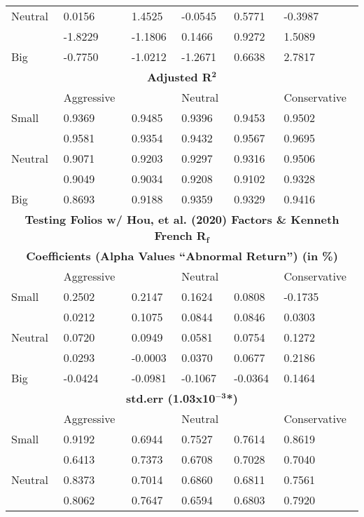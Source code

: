 \documentclass[11pt, english]{article}
\begin{document}
\begin{center}
\begin{longtable}{ p{1.5cm} | p{1.5cm} p{1.5cm} p{1.5cm} p{1.5cm} p{1.5cm} }
        Neutral & 0.0156 & 1.4525 & -0.0545 & 0.5771 & -0.3987\\
        & -1.8229 & -1.1806 & 0.1466 & 0.9272 & 1.5089\\
        Big & -0.7750 & -1.0212 & -1.2671 & 0.6638 & 2.7817\\
        \hline
        \multicolumn{6}{c}{\textbf{Adjusted R$\mathbf{^2}$}}\\
        \hline
        & Aggressive & & Neutral & & Conservative\\
        \hline
        Small & 0.9369 & 0.9485 & 0.9396 & 0.9453 & 0.9502\\
        & 0.9581 & 0.9354 & 0.9432 & 0.9567 & 0.9695\\
        Neutral & 0.9071 & 0.9203 & 0.9297 & 0.9316 & 0.9506\\
        & 0.9049 & 0.9034 & 0.9208 & 0.9102 & 0.9328\\
        Big & 0.8693 & 0.9188 & 0.9359 & 0.9329 & 0.9416\\
        \hline
        \hline
        \multicolumn{6}{c}{\textbf{Testing Folios w/ Hou, et al. (2020) Factors \& Kenneth French R$\mathbf{_f}$}}\\
        \hline
        \hline
        \multicolumn{6}{c}{\textbf{Coefficients (Alpha Values ``Abnormal Return'') (in \%)}}\\
	\hline
        & Aggressive & & Neutral & & Conservative\\
        \hline
        Small & 0.2502 & 0.2147 & 0.1624 & 0.0808 & -0.1735\\
        & 0.0212 & 0.1075 & 0.0844 & 0.0846 & 0.0303\\
        Neutral & 0.0720 & 0.0949 & 0.0581 & 0.0754 & 0.1272\\
        & 0.0293 & -0.0003 & 0.0370 & 0.0677 & 0.2186\\
        Big & -0.0424 & -0.0981 & -0.1067 & -0.0364 & 0.1464\\
        \hline
        \multicolumn{6}{c}{\textbf{std.err (1.03x10$\mathbf{^{-3}}$*)}}\\
        \hline
        & Aggressive & & Neutral & & Conservative\\
        \hline
        Small & 0.9192 & 0.6944 & 0.7527 & 0.7614 & 0.8619\\
        & 0.6413 & 0.7373 & 0.6708 & 0.7028 & 0.7040\\
        Neutral & 0.8373 & 0.7014 & 0.6860 & 0.6811 & 0.7561\\
        & 0.8062 & 0.7647 & 0.6594 & 0.6803 & 0.7920\\

\end{longtable}
\end{center}
\end{document}
